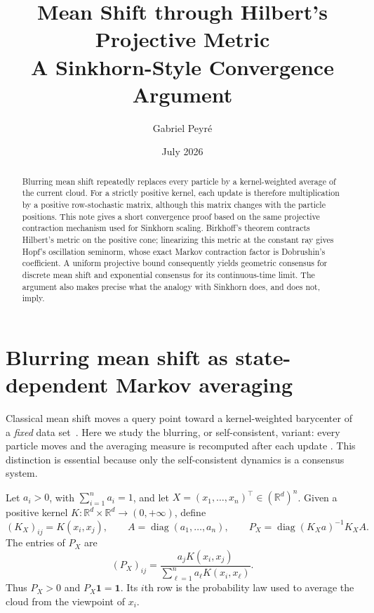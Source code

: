 \documentclass[11pt]{article}
\title{Mean Shift through Hilbert's Projective Metric\\
  \large A Sinkhorn-Style Convergence Argument}
\author{Gabriel Peyr\'e}
\date{July 2026}
\theoremstyle{definition}
\newcommand{\R}{\mathbb{R}}
\newcommand{\one}{\mathbf{1}}
\newcommand{\diag}{\operatorname{diag}}
\begin{document}
\maketitle

\begin{abstract}
Blurring mean shift repeatedly replaces every particle by a kernel-weighted
average of the current cloud.  For a strictly positive kernel, each update is
therefore multiplication by a positive row-stochastic matrix, although this
matrix changes with the particle positions.  This note gives a short
convergence proof based on the same projective contraction mechanism used for
Sinkhorn scaling.  Birkhoff's theorem contracts Hilbert's metric on the
positive cone; linearizing this metric at the constant ray gives Hopf's
oscillation seminorm, whose exact Markov contraction factor is Dobrushin's
coefficient.  A uniform projective bound consequently yields geometric
consensus for discrete mean shift and exponential consensus for its
continuous-time limit.  The argument also makes precise what the analogy with
Sinkhorn does, and does not, imply.
\end{abstract}

\section{Blurring mean shift as state-dependent Markov averaging}

Classical mean shift moves a query point toward a kernel-weighted barycenter of
a \emph{fixed} data set~\cite{FukunagaHostetler1975,ComaniciuMeer2002MeanShift}.
Here we study the blurring, or self-consistent, variant: every particle moves
and the averaging measure is recomputed after each update
\cite{Chen2015BlurringMeanShift}.  This distinction is essential because only
the self-consistent dynamics is a consensus system.

Let $a_i>0$, with $\sum_{i=1}^n a_i=1$, and let
$X=(x_1,\ldots,x_n)^\top\in(\R^d)^n$.  Given a positive kernel
$K:\R^d\times\R^d\to(0,+\infty)$, define
\begin{equation}\label{eq:kernel-markov}
  (K_X)_{ij}=K(x_i,x_j),
  \qquad
  A=\diag(a_1,\ldots,a_n),
  \qquad
  P_X=\diag(K_Xa)^{-1}K_XA .
\end{equation}
The entries of $P_X$ are
\begin{equation}\label{eq:mean-shift-weights}
  (P_X)_{ij}
  =
  \frac{a_jK(x_i,x_j)}{\sum_{\ell=1}^n a_\ell K(x_i,x_\ell)}.
\end{equation}
Thus $P_X>0$ and $P_X\one=\one$.  Its $i$th row is the probability law used to
average the cloud from the viewpoint of $x_i$.
\end{document}
